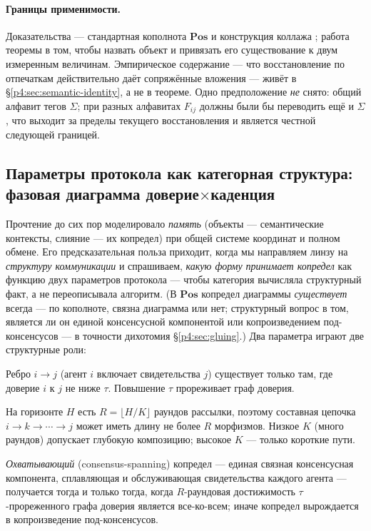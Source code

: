 \documentclass{article}
\begin{document}
\paragraph{Границы применимости.} Доказательства --- стандартная кополнота
$\mathbf{Pos}$ и конструкция коллажа \citep{maclane1998categories}; работа
теоремы в том, чтобы назвать объект и привязать его существование к двум
измеренным величинам. Эмпирическое содержание --- что восстановление по
отпечаткам действительно даёт сопряжённые вложения --- живёт в
\S\ref{p4:sec:semantic-identity}, а не в теореме. Одно предположение \emph{не}
снято: общий алфавит тегов $\Sigma$; при разных алфавитах $F_{ij}$ должны были
бы переводить ещё и $\Sigma$, что выходит за пределы текущего восстановления и
является честной следующей границей.

\subsection{Параметры протокола как категорная структура: фазовая диаграмма доверие\texorpdfstring{$\times$}{x}каденция}
\label{p4:sec:phase-diagram}

Прочтение до сих пор моделировало \emph{память} (объекты --- семантические
контексты, слияние --- их копредел) при общей системе координат и полном
обмене. Его предсказательная польза приходит, когда мы направляем линзу на
\emph{структуру коммуникации} и спрашиваем, \emph{какую форму принимает
копредел} как функцию двух параметров протокола --- чтобы категория вычисляла
структурный факт, а не переописывала алгоритм. (В $\mathbf{Pos}$ копредел
диаграммы \emph{существует} всегда --- по кополноте, связна диаграмма или
нет; структурный вопрос в том, является ли он единой консенсусной
компонентой или копроизведением под-консенсусов --- в точности дихотомия
\S\ref{p4:sec:gluing}.) Два параметра играют две
структурные роли:
\begin{description}[leftmargin=12pt,topsep=2pt,itemsep=1pt]
\item[Доверие $\tau$ управляет морфизмами.] Ребро $i\!\to\!j$ (агент $i$
включает свидетельства $j$) существует только там, где доверие $i$ к $j$ не
ниже $\tau$. Повышение $\tau$ прореживает граф доверия.
\item[Каденция $K$ управляет глубиной композиции.] На горизонте $H$ есть
$R=\lfloor H/K\rfloor$ раундов рассылки, поэтому составная цепочка
$i\!\to\!k\!\to\!\cdots\!\to\!j$ может иметь длину не более $R$ морфизмов.
Низкое $K$ (много раундов) допускает глубокую композицию; высокое $K$ ---
только короткие пути.
\end{description}
\emph{Охватывающий} (consensus-spanning) копредел --- единая связная
консенсусная компонента, сплавляющая и обслуживающая свидетельства каждого
агента --- получается тогда и только тогда, когда $R$-раундовая достижимость
$\tau$-прореженного графа доверия является все-ко-всем; иначе копредел
вырождается в копроизведение под-консенсусов.
\end{document}
